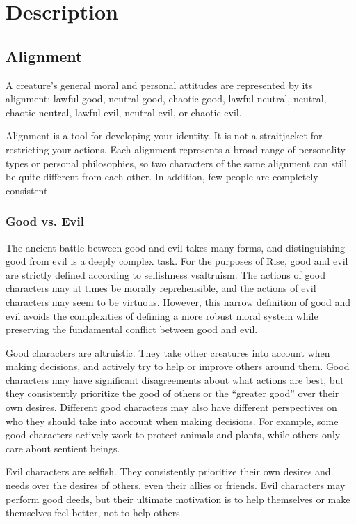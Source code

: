\chapter{Description}

\section{Alignment}\label{Alignment}
    A creature's general moral and personal attitudes are represented by its alignment: lawful good, neutral good, chaotic good, lawful neutral, neutral, chaotic neutral, lawful evil, neutral evil, or chaotic evil.

    Alignment is a tool for developing your identity.
    It is not a straitjacket for restricting your actions.
    Each alignment represents a broad range of personality types or personal philosophies, so two characters of the same alignment can still be quite different from each other.
    In addition, few people are completely consistent.

    \subsection{Good vs. Evil}
        The ancient battle between good and evil takes many forms, and distinguishing good from evil is a deeply complex task.
        For the purposes of Rise, good and evil are strictly defined according to selfishness vs\. altruism.
        The actions of good characters may at times be morally reprehensible, and the actions of evil characters may seem to be virtuous.
        However, this narrow definition of good and evil avoids the complexities of defining a more robust moral system while preserving the fundamental conflict between good and evil.

         Good characters are altruistic.
        They take other creatures into account when making decisions, and actively try to help or improve others around them.
        Good characters may have significant disagreements about what actions are best, but they consistently prioritize the good of others or the ``greater good'' over their own desires.
        Different good characters may also have different perspectives on who they should take into account when making decisions.
        For example, some good characters actively work to protect animals and plants, while others only care about sentient beings.

         Evil characters are selfish.
        They consistently prioritize their own desires and needs over the desires of others, even their allies or friends.
        Evil characters may perform good deeds, but their ultimate motivation is to help themselves or make themselves feel better, not to help others.

